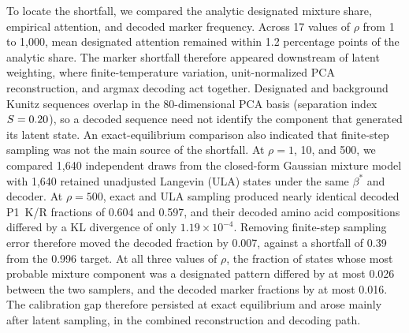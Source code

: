 To locate the shortfall, we compared the analytic designated mixture share, empirical attention,
and decoded marker frequency. Across 17 values of $\rho$ from 1 to 1{,}000, mean designated
attention remained within 1.2 percentage points of the analytic share. The marker shortfall
therefore appeared downstream of latent weighting, where finite-temperature variation,
unit-normalized PCA reconstruction, and argmax decoding act together. Designated and background Kunitz sequences overlap in the
80-dimensional PCA basis (separation index $S=0.20$), so a decoded sequence need
not identify the component that generated its latent state. An exact-equilibrium comparison also
indicated that finite-step sampling was not the main source of the shortfall. At $\rho = 1$, 10,
and 500, we compared 1{,}640 independent draws from the
closed-form Gaussian mixture model with 1{,}640 retained unadjusted Langevin (ULA) states under
the same $\beta^{*}$ and decoder. At $\rho=500$, exact and ULA sampling produced nearly
identical decoded P1~K/R fractions of 0.604 and 0.597, and their decoded amino acid compositions differed by a KL
divergence of only $1.19\times10^{-4}$. Removing finite-step sampling error therefore moved the
decoded fraction by 0.007, against a shortfall of 0.39 from the 0.996 target. At all three values
of $\rho$, the fraction of states whose most probable mixture component was a designated
pattern differed by at most 0.026 between the two samplers, and the decoded marker fractions by
at most 0.016. The calibration gap therefore persisted at exact equilibrium and arose mainly
after latent sampling, in the combined reconstruction and decoding path.


